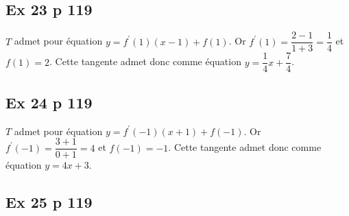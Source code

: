 \documentclass[12pt,a5paper]{book}
\begin{document}
\subsection*{Ex 23 p 119}
$T$ admet pour équation $y=f^{\prime}(1)(x-1)+f(1)$. Or $f^{\prime}(1)=\dfrac{2-1}{1+3}=\dfrac{1}{4}$ et $f(1)=2$. Cette tangente admet donc comme équation $y=\dfrac{1}{4} x+\dfrac{7}{4}$.

\subsection*{Ex 24 p 119}

$T$ admet pour équation $y=f^{\prime}(-1)(x+1)+f(-1) .$ Or $f^{\prime}(-1)=\dfrac{3+1}{0+1}=4$ et $f(-1)=-1$.
Cette tangente admet donc comme équation $y=4 x+3$.

\subsection*{Ex 25 p 119}
\end{document}
